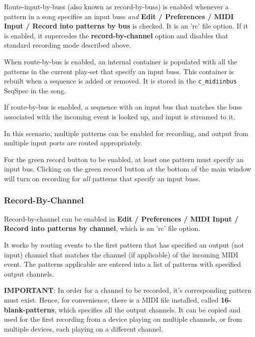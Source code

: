    Route-input-by-buss (also known as record-by-buss)
   is enabled whenever a pattern in a song specifies an
   input buss \textsl{and}
   \textbf{Edit / Preferences / MIDI Input / Record into patterns by
   bus} is checked. It is an 'rc' file option.
   If it is enabled, it supercedes the
   \textbf{record-by-channel} option and
   disables that standard recording mode described above.

   When route-by-bus is enabled, an internal container is populated with
   all the patterns in the current play-set that specify an input buss.
   This container is rebuilt when a sequence is added or removed.
   It is stored in the \texttt{c\_midiinbus} SeqSpec in the song.

   If route-by-bus is enabled, a sequence with an input bus that matches the
   buss associated with the incoming event is looked up, and input is
   streamed to it.

   In this scenario, multiple patterns can be enabled for recording,
   and output from multiple input ports are routed appropriately.

   For the green record button to be enabled, at least one pattern
   must specify an input bus.
   Clicking on the green record button at the bottom of the main window
   will turn on recording for \textsl{all}
   patterns that specify an input buss.

\subsubsection{Record-By-Channel}
\label{subsubsec:recording_record_by_channel}

   Record-by-channel can be enabled in
   \textbf{Edit / Preferences / MIDI Input / Record into patterns by
   channel}, which is an 'rc' file option.

   It works by routing events to the first pattern that has specified an 
   output (not input) channel that matches the channel (if applicable) of
   the incoming MIDI event.
   The patterns applicable are entered into a list of patterns with specified
   output channels.

   \textbf{IMPORTANT}:
   In order for a channel to be recorded, it's corresponding pattern
   must exist. Hence,
   for convenience, there is a MIDI file installed, called
   \textbf{16-blank-patterns}, which specifies all the output channels.
   It can be copied and used for the first recording from a device
   playing on multiple channels, or from multiple devices, each playing
   on a different channel.

